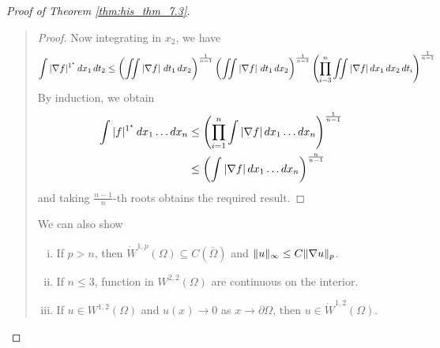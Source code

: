 \documentclass[10pt, oneside, reqno]{amsart}
\theoremstyle{plain}%
\numberwithin{equation}{section}
\theoremstyle{definition}
\theoremstyle{remark}
\begin{document}
\begin{proof}[Proof of Theorem \ref{thm:his_thm_7.3}]{\ }
\begin{quote}
\begin{proof}
		 Now integrating in $x_2$, we have \begin{align*}
		 			\int |\nabla f |^{1^\star} \, dx_1 \, dt_2 \leq \left( \iint \left|\nabla f \right| \, dt_1 \, dx_2 \right)^{\frac{1}{n-1}}  \left( \iint \left|\nabla f \right| \, dt_1 \, dx_2 \right)^{\frac{1}{n-1}}  \left(\prod_{i=3}^n \iint |\nabla f| \, dx_1 \, dx_2 \, dt_i \right)^{\frac{1}{n-1}}
		 		\end{align*}
		By induction, we obtain \begin{align*}			
			\int |f|^{1^\star} \, dx_1 \dots dx_n  &\leq \left( \prod_{i=1}^n \int |\nabla f | \, dx_1 \dots dx_n \right)^{\frac{1}{n-1}} \\
						&\leq \left( \int |\nabla f| \, dx_1 \dots dx_n \right)^{\frac{n}{n-1}}
		\end{align*}	 and taking $\frac{n-1}{n}$-th roots obtains the required result.
		\end{proof}
		
		We can also show \begin{enumerate}[(i)]
			\item If $p > n$, then $\dot W^{1, p}(\Omega) \subseteq C(\overline \Omega)$ and $\| u \|_{\infty} \leq C \| \nabla u \|_p$.
			\item If $n \leq 3$, function in $W^{2, 2}(\Omega)$ are continuous on the interior.
			\item If $u \in W^{1, 2}(\Omega)$ and $u(x) \rightarrow 0$ as $x \rightarrow \partial \Omega$, then $u \in \dot W^{1, 2}(\Omega)$.
		\end{enumerate}
	
	\end{quote}
	
	
	

\end{proof}
\end{document}
